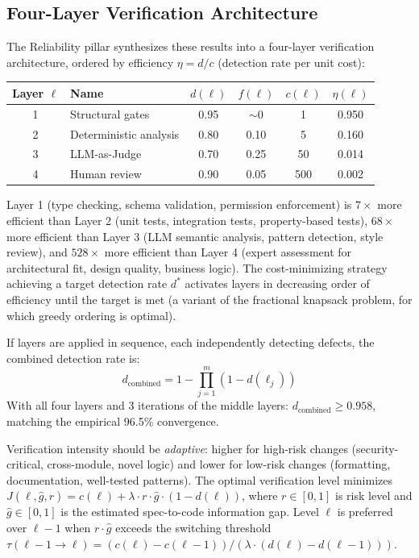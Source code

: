 \documentclass[11pt, a4paper]{googledeepmind}
\begin{document}
\subsection{Four-Layer Verification Architecture}

The Reliability pillar synthesizes these results into a four-layer verification architecture, ordered by efficiency $\eta = d/c$ (detection rate per unit cost):

\begin{center}
\small
\begin{tabular}{clcccc}
\toprule
Layer $\ell$ & Name & $d(\ell)$ & $f(\ell)$ & $c(\ell)$ & $\eta(\ell)$ \\
\midrule
1 & Structural gates & 0.95 & ${\sim}0$ & 1 & 0.950 \\
2 & Deterministic analysis & 0.80 & 0.10 & 5 & 0.160 \\
3 & LLM-as-Judge & 0.70 & 0.25 & 50 & 0.014 \\
4 & Human review & 0.90 & 0.05 & 500 & 0.002 \\
\bottomrule
\end{tabular}
\end{center}

Layer 1 (type checking, schema validation, permission enforcement) is $7\times$ more efficient than Layer 2 (unit tests, integration tests, property-based tests), $68\times$ more efficient than Layer 3 (LLM semantic analysis, pattern detection, style review), and $528\times$ more efficient than Layer 4 (expert assessment for architectural fit, design quality, business logic). The cost-minimizing strategy achieving a target detection rate $d^*$ activates layers in decreasing order of efficiency until the target is met (a variant of the fractional knapsack problem, for which greedy ordering is optimal).

If layers are applied in sequence, each independently detecting defects, the combined detection rate is:
\begin{equation}
    d_{\text{combined}} = 1 - \prod_{j=1}^{m} (1 - d(\ell_j))
\end{equation}
With all four layers and 3 iterations of the middle layers: $d_{\text{combined}} \geq 0.958$, matching the empirical 96.5\% convergence.

Verification intensity should be \emph{adaptive}: higher for high-risk changes (security-critical, cross-module, novel logic) and lower for low-risk changes (formatting, documentation, well-tested patterns). The optimal verification level minimizes $J(\ell, \hat{g}, r) = c(\ell) + \lambda \cdot r \cdot \hat{g} \cdot (1 - d(\ell))$, where $r \in [0,1]$ is risk level and $\hat{g} \in [0,1]$ is the estimated spec-to-code information gap. Level $\ell$ is preferred over $\ell - 1$ when $r \cdot \hat{g}$ exceeds the switching threshold $\tau(\ell{-}1 \to \ell) = (c(\ell) - c(\ell{-}1)) / (\lambda \cdot (d(\ell) - d(\ell{-}1)))$.
\end{document}
